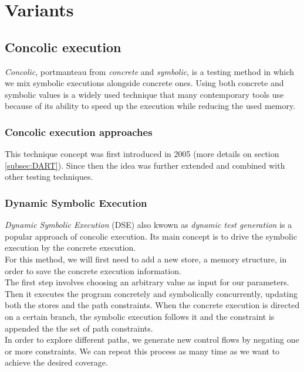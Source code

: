 \documentclass[11pt, conference]{IEEEtran}
\begin{document}
  \section{Variants}
    \subsection{Concolic execution}
    \label{subsec:concolicExecution}
    	\emph{Concolic}, portmanteau from \emph{concrete} and \emph{symbolic}, is a testing method in which we mix symbolic executions alongside concrete ones. Using both concrete and symbolic values is a widely used technique that many contemporary tools use because of its ability to speed up the execution while reducing the used memory.\\

    	\subsubsection*{Concolic execution approaches}
    		This technique concept was first introduced in 2005 \cite{godefroid2005dart} (more details on section \ref{subsec:DART}). %
    	  Since then the idea was further extended and combined with other testing techniques.\\

  		\subsubsection{Dynamic Symbolic Execution}
  		\label{subsec:dynamicSymbolicExec}
  			\emph{Dynamic Symbolic Execution} (DSE) also kwown as \emph{dynamic test generation} \cite{godefroid2005dart} is a popular approach of concolic execution. Its main concept is to drive the symbolic execution by the concrete execution.\\

  			For this method, we will first need to add a new store, a memory structure, in order to save the concrete execution information.\\
  			The first step involves choosing an arbitrary value as input for our parameters. Then it executes the program concretely and symbolically concurrently, updating both the stores and the path constraints. When the concrete execution is directed on a certain branch, the symbolic execution follows it and the constraint is appended the the set of path constraints.\\
  			In order to explore different paths, we generate new control flows by negating one or more constraints. We can repeat this process as many time as we want to achieve the desired coverage.\\
\end{document}
